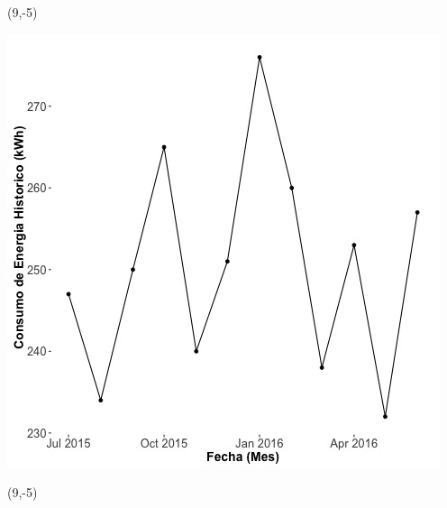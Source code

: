 \documentclass{article}\usepackage[]{graphicx}\usepackage[]{color}
\newenvironment{knitrout}{}{} %
\begin{document}
 \begin{textblock}{1}(9,-5)
\begin{minipage}{20em}
\begingroup

\endgroup
\end{minipage}
\end{textblock}

\begin{knitrout}
\color{fgcolor}
\includegraphics[scale=0.65]{figure/A18_historico_energia} 
\end{knitrout}

 \begin{textblock}{1}(9,-5)
\begin{minipage}{20em}
\begingroup

\endgroup
\end{minipage}
\end{textblock}
\end{document}

